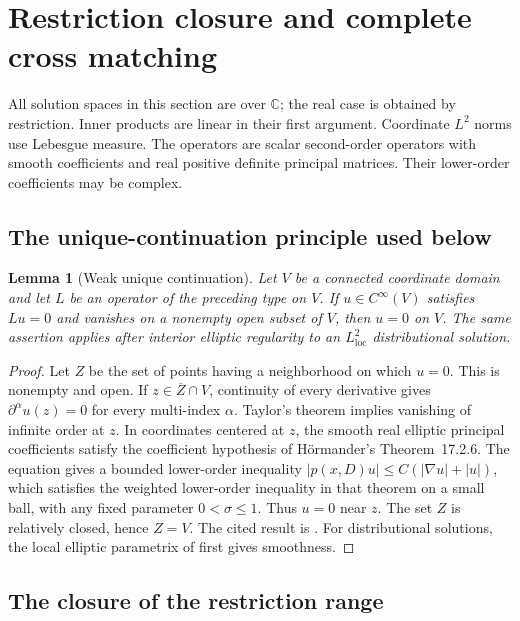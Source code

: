 \documentclass[11pt]{article}
\newtheorem{lemma}[theorem]{Lemma}
\theoremstyle{definition}
\theoremstyle{remark}
\numberwithin{equation}{section}
\begin{document}
\clearpage
\section{Restriction closure and complete cross matching}
\label{cross-repairs:section}

All solution spaces in this section are over $\mathbb C$; the real case is
obtained by restriction. Inner products are linear in their first argument.
Coordinate $L^2$ norms use Lebesgue measure. The operators are scalar
second-order operators with smooth coefficients and real positive definite
principal matrices. Their lower-order coefficients may be complex.

\subsection{The unique-continuation principle used below}

\begin{lemma}[Weak unique continuation]\label{cross-repairs:ucp}
Let $V$ be a connected coordinate domain and let $L$ be an operator of the
preceding type on $V$. If $u\in C^\infty(V)$ satisfies $Lu=0$ and vanishes
on a nonempty open subset of $V$, then $u=0$ on $V$.
The same assertion applies after interior elliptic regularity to an
$L^2_{\mathrm{loc}}$ distributional solution.
\end{lemma}

\begin{proof}
Let $Z$ be the set of points having a neighborhood on which $u=0$.
This is nonempty and open. If $z\in\overline Z\cap V$, continuity of every
derivative gives $\partial^\alpha u(z)=0$ for every multi-index $\alpha$.
Taylor's theorem implies vanishing of infinite order at $z$.
In coordinates centered at $z$, the smooth real elliptic principal
coefficients satisfy the coefficient hypothesis of H\"ormander's
Theorem~17.2.6. The equation gives a bounded lower-order inequality
$|p(x,D)u|\le C(|\nabla u|+|u|)$, which satisfies the weighted
lower-order inequality in that theorem on a small ball, with any
fixed parameter $0<\sigma\le1$. Thus $u=0$ near $z$.
The set $Z$ is relatively closed, hence $Z=V$.
The cited result is \citet[Theorem~17.2.6, pp.~14--17]{HormanderIII2007}.
For distributional solutions, the local elliptic parametrix of
\citet[Theorem~18.1.24, p.~87]{HormanderIII2007} first gives smoothness.
\end{proof}

\subsection{The closure of the restriction range}
\end{document}
